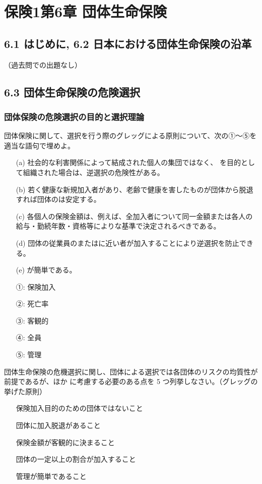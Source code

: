 \documentclass[report,gutter=10mm,fore-edge=10mm,uplatex,dvipdfmx]{jlreq}
\begin{document}
\chapter{保険1第6章 団体生命保険}
\section{6.1 はじめに,  6.2 日本における団体生命保険の沿革}
（過去問での出題なし）
\section{6.3 団体生命保険の危険選択}
\subsection{団体保険の危険選択の目的と選択理論}
団体保険に関して、選択を行う際のグレッグによる原則について、次の①～⑤を適当な語句で埋めよ。

\begin{itemize}
\item[ (a)]  社会的な利害関係によって結成された個人の集団ではなく、 を目的として組織された場合は、逆選択の危険性がある。
\item[ (b)]  若く健康な新規加入者があり、老齢で健康を害したものが団体から脱退すれば団体のは安定する。
\item[ (c)]  各個人の保険金額は、例えば、全加入者について同一金額または各人の給与・勤続年数・資格等によりな基準で決定されるべきである。
\item[ (d)]  団体の従業員のまたはに近い者が加入することにより逆選択を防止できる。
\item[ (e)]  が簡単である。
\end{itemize}

\answer{}
\begin{itemize}
\item[ ①: ] 保険加入
\item[ ②: ] 死亡率
\item[ ③: ] 客観的
\item[ ④: ] 全員
\item[ ⑤: ] 管理
\end{itemize}

団体生命保険の危機選択に関し、団体による選択では各団体のリスクの均質性が前提であるが、ほか
に考慮する必要のある点を 5 つ列挙しなさい。（グレッグの挙げた原則）
\answer{}
\begin{itemize}
\item[]  保険加入目的のための団体ではないこと
\item[]  団体に加入脱退があること
\item[]  保険金額が客観的に決まること
\item[]  団体の一定以上の割合が加入すること
\item[]  管理が簡単であること
\end{itemize}
\end{document}
